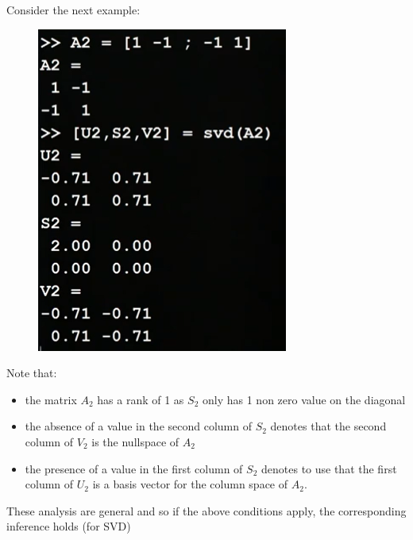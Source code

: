 \documentclass[12pt]{book}
\begin{document}
Consider the next example:
\begin{figure}[h]
        \centering
        \includegraphics[scale = 0.5]{./figures/SVDex}
\end{figure}

Note that:
\begin{itemize}
        \item the matrix $A_2$ has a rank of 1 as $S_2$ only has 1 non zero value on the diagonal
        \item the absence of a value in the second column of $S_2$ denotes that the second column of $V_2$ is the nullspace of $A_2$
        \item the presence of a value in the first column of $S_2$ denotes to use that the first column of $U_2$ is a basis vector
                for the column space of $A_2$.
\end{itemize}
These analysis are general and so if the above conditions apply, the corresponding inference holds (for SVD)
\pagebreak
\end{document}
